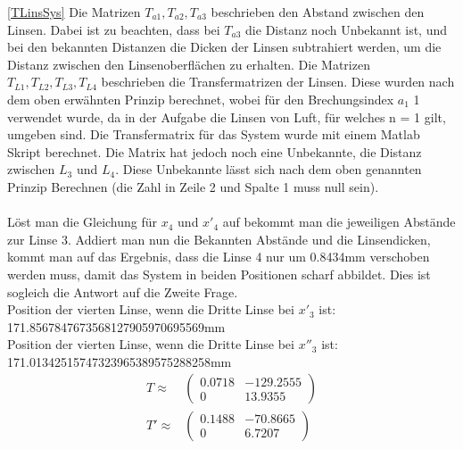 \documentclass[11pt,twoside,a4paper]{article}
\begin{document}
	\ref{TLinsSys} Die Matrizen \(T_{a1},T_{a2},T_{a3}\) beschrieben den Abstand zwischen den Linsen. Dabei ist zu beachten, dass bei \(T_{a3}\) die Distanz noch Unbekannt ist, und bei den bekannten Distanzen die Dicken der Linsen subtrahiert werden, um die Distanz zwischen den Linsenoberflächen zu erhalten. Die Matrizen \(T_{L1},T_{L2},T_{L3},T_{L4}\) beschrieben die Transfermatrizen der Linsen. Diese wurden nach dem oben erwähnten Prinzip berechnet, wobei für den Brechungsindex \(a_{1}\) 1 verwendet wurde, da in der Aufgabe die Linsen von Luft, für welches n = 1 gilt, umgeben sind.
	Die Transfermatrix für das System wurde mit einem Matlab Skript berechnet. Die Matrix hat jedoch noch eine Unbekannte, die Distanz zwischen \(L_{3}\) und \(L_{4}\). Diese Unbekannte lässt sich nach dem oben genannten Prinzip Berechnen (die Zahl in Zeile 2 und Spalte 1 muss null sein). \\
	\\
	Löst man die Gleichung für \(x_{4}\) und \(x'_{4}\) auf bekommt man die jeweiligen Abstände zur Linse 3. Addiert man nun die Bekannten Abstände und die Linsendicken, kommt man auf das Ergebnis, dass die Linse 4 nur um  0.8434mm verschoben werden muss, damit das System in beiden Positionen scharf abbildet. Dies ist sogleich die Antwort auf die Zweite Frage. \\
	Position der vierten Linse, wenn die Dritte Linse bei \(x'_{3}\) ist: 171.8567847673568127905970695569mm \\
	Position der vierten Linse, wenn die Dritte Linse bei \(x''_{3}\) ist: 171.01342515747323965389575288258mm \\
	\begin{equation*}
	\begin{aligned}
	T \approx
	&
	\begin{pmatrix}
	0.0718 & -129.2555\\
	0 & 13.9355
	\end{pmatrix}\\
	T' \approx
	&
	\begin{pmatrix}
	0.1488 & -70.8665\\
	0 & 6.7207
	\end{pmatrix}
	\end{aligned}
	\end{equation*}
\end{document}
